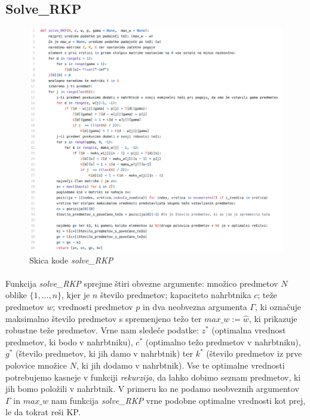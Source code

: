 \documentclass[a4paper,12pt]{article}
\theoremstyle{definition}
\begin{document}
\subsection{Solve\_RKP}
\begin{figure}[h]
    \includegraphics[width=13cm]{prava_RKP.png}
    \caption{Skica kode \textit{solve\_RKP}}
    \label{fig:koda1}    
\end{figure}

\paragraph{}
\noindent Funkcija \textit{solve\_RKP} sprejme štiri obvezne argumente: množico predmetov $N$ oblike
$\{1, \dots, n\}$, kjer je $n$ število predmetov; kapaciteto nahrbtnika $c$; teže predmetov $w$; vrednosti predmetov $p$ in dva neobvezna
argumenta $\Gamma$, ki označuje maksimalno število predmetov s spremenjeno težo ter $max\_w := \hat{w}$, ki prikazuje robustne teže predmetov. 
Vrne nam sledeče podatke: $z^{*}$ (optimalna vrednost predmetov, ki bodo v nahrbtniku), $c^{*}$ (optimalno težo predmetov v nahrbtniku), $g^{*}$ (število 
predmetov, ki jih damo v nahrbtnik) ter $k^{*}$ (število predmetov iz prve polovice množice $N$, ki jih dodamo v nahrbtnik). Vse te optimalne 
vrednosti potrebujemo kasneje v funkciji \textit{rekurzija}, da lahko dobimo seznam predmetov, ki jih bomo položili v nahrbtnik. V primeru ko 
ne podamo neobveznih argumentov $\Gamma$ in $max\_w$ nam funkcija \textit{solve\_RKP} vrne podobne optimalne vrednosti kot prej, le da tokrat 
reši KP.
\par
\end{document}
